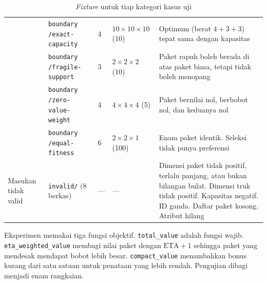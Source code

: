 \begin{table}[H]
\begin{tabular}{@{}p{2.6cm}p{3.3cm}p{1.0cm}p{2.3cm}p{5.4cm}@{}}
                                  & \texttt{boundary /exact-capacity}    & 4     & $10\times10\times10$ (10) & Optimum (berat $4+3+3$) tepat sama dengan kapasitas                                                                                                                   \\
                                  & \texttt{boundary /fragile-support}   & 3     & $2\times2\times2$ (10)    & Paket rapuh boleh berada di atas paket biasa, tetapi tidak boleh menopang                                                                                             \\
                                  & \texttt{boundary /zero-value-weight} & 4     & $4\times4\times4$ (5)     & Paket bernilai nol, berbobot nol, dan keduanya nol                                                                                                                    \\
                                  & \texttt{boundary /equal-fitness}     & 6     & $2\times2\times1$ (100)   & Enam paket identik. Seleksi tidak punya preferensi                                                                                                                    \\
        \midrule
        Masukan tidak valid       & \texttt{invalid/} (8 berkas)         & ---   & ---                       & Dimensi paket tidak positif, terlalu panjang, atau bukan bilangan bulat. Dimensi truk tidak positif. Kapasitas negatif. ID ganda. Daftar paket kosong. Atribut hilang \\
        \bottomrule
    \end{tabular}
    \caption{\textit{Fixture} untuk tiap kategori kasus uji}
    \label{tab:fixtures}
\end{table}

Eksperimen memakai tiga fungsi objektif. \texttt{total\_value} adalah fungsi wajib. \texttt{eta\_weighted\_value} membagi nilai paket dengan $\text{ETA}+1$ sehingga paket yang mendesak mendapat bobot lebih besar. \texttt{compact\_value} menambahkan bonus kurang dari satu satuan untuk penataan yang lebih rendah. Pengujian dibagi menjadi enam rangkaian.

